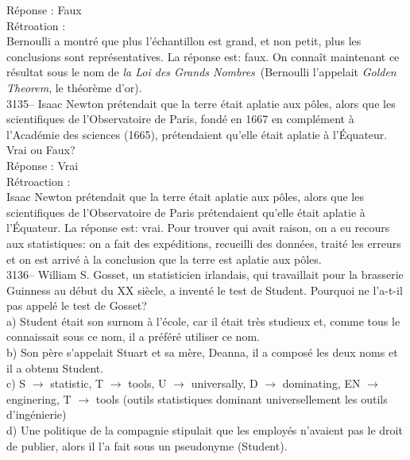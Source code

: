 \documentclass[letterpaper, 12pt]{article}
\begin{document}
R\'eponse : Faux\\

R\'etroation :\\
Bernoulli a montr\'e que plus l'\'echantillon est grand, et non petit, plus les conclusions sont repr\'esentatives. La r\'eponse est: faux. On conna\^it maintenant ce r\'esultat sous le nom de \og \emph{la Loi des Grands Nombres}\fg \ (Bernoulli l'appelait \og \emph{Golden Theorem}\fg, le th\'eor\`eme d'or).\\



3135-- Isaac Newton pr\'etendait que la terre \'etait aplatie aux p\^oles, alors que les scientifiques de l'Observatoire de Paris, fond\'e en 1667 en compl\'ement \`a l'Acad\'emie des sciences (1665), pr\'etendaient qu'elle \'etait aplatie \`a l'\'Equateur.\\
Vrai ou Faux?\\

R\'eponse : Vrai\\

R\'etroaction :\\
Isaac Newton pr\'etendait que la terre \'etait aplatie aux p\^oles, alors que les scientifiques de l'Observatoire de Paris pr\'etendaient qu'elle \'etait aplatie \`a l'\'Equateur. La r\'eponse est: vrai. Pour trouver qui avait raison, on a eu recours aux statistiques: on a fait des exp\'editions, recueilli des donn\'ees, trait\'e les erreurs et on est arriv\'e \`a la conclusion que la terre est aplatie aux p\^oles.\\



3136-- William S. Gosset, un statisticien irlandais, qui travaillait pour la brasserie Guinness au d\'ebut du {\scriptsize XX\ieme{}} si\`ecle, a invent\'e le test de Student. Pourquoi ne l'a-t-il pas appel\'e le test de Gosset?\\

a) Student \'etait son surnom \`a l'\'ecole, car il \'etait tr\`es studieux et, comme tous le connaissait sous ce nom, il a pr\'ef\'er\'e utiliser ce nom.\\
b) Son p\`ere s'appelait Stuart et sa m\`ere, Deanna, il a compos\'e les deux noms et il a obtenu Student.\\
c) S $\rightarrow$ statistic, T $\rightarrow$ tools, U $\rightarrow$ universally, D $\rightarrow$ dominating, EN $\rightarrow$ enginering, T $\rightarrow$ tools (outils statistiques dominant universellement les outils d'ing\'enierie)\\
d) Une politique de la compagnie stipulait que les employ\'es n'avaient pas le droit de publier, alors il l'a fait sous un pseudonyme (Student).\\
\end{document}
